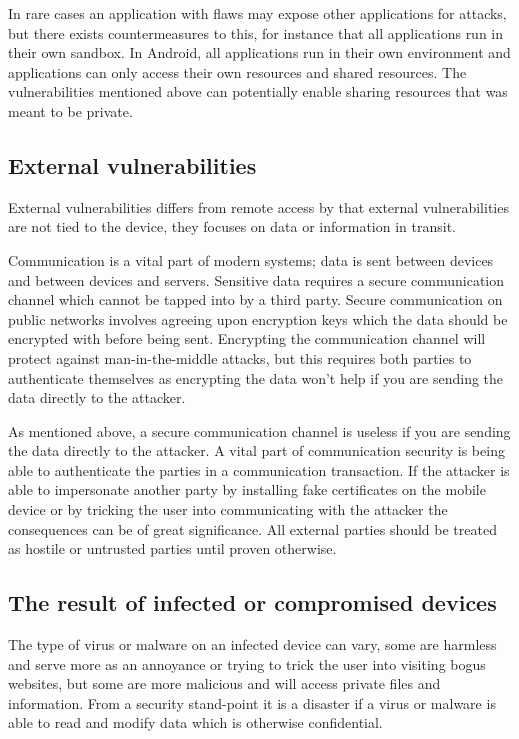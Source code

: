 In rare cases an application with flaws may expose other applications for attacks, but there exists countermeasures to this, for instance that all applications run in their own sandbox. In Android, all applications run in their own environment and applications can only access their own resources and shared resources. The vulnerabilities mentioned above can potentially enable sharing resources that was meant to be private.

\subsection{External vulnerabilities}
External vulnerabilities differs from remote access by that external vulnerabilities are not tied to the device, they focuses on data or information in transit.

Communication is a vital part of modern systems; data is sent between devices and between devices and servers. Sensitive data requires a secure communication channel which cannot be tapped into by a third party. Secure communication on public networks involves agreeing upon encryption keys which the data should be encrypted with before being sent. Encrypting the communication channel will protect against man-in-the-middle attacks, but this requires both parties to authenticate themselves as encrypting the data won't help if you are sending the data directly to the attacker.

As mentioned above, a secure communication channel is useless if you are sending the data directly to the attacker. A vital part of communication security is being able to authenticate the parties in a communication transaction. If the attacker is able to impersonate another party by installing fake certificates on the mobile device or by tricking the user into communicating with the attacker the consequences can be of great significance. All external parties should be treated as hostile or untrusted parties until proven otherwise.

\subsection{The result of infected or compromised devices}
The type of virus or malware on an infected device can vary, some are harmless and serve more as an annoyance or trying to trick the user into visiting bogus websites, but some are more malicious and will access private files and information. From a security stand-point it is a disaster if a virus or malware is able to read and modify data which is otherwise confidential.

